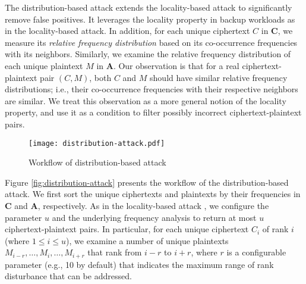 The distribution-based attack extends the locality-based attack \cite{li17} to significantly remove false positives.  It leverages the locality property in backup workloads as in the locality-based attack.  In addition, for each unique ciphertext $C$ in $\mathbf{C}$, we measure its {\em relative frequency distribution} based on its co-occurrence frequencies with its neighbors. Similarly, we examine the relative frequency distribution of each unique plaintext $M$ in $\mathbf{A}$.  Our observation is that for a real ciphertext-plaintext pair $(C, M)$, both $C$ and $M$ should have similar relative frequency distributions; i.e., their co-occurrence frequencies with their respective neighbors are similar.  We treat this observation as a more general notion of the locality property, and use it as a condition to filter possibly incorrect ciphertext-plaintext pairs. 


\begin{figure}[!htb]
    \small
    \centering
    \texttt{[image: distribution-attack.pdf]}
    \caption{Workflow of  distribution-based attack} 
    \label{fig:Workflow of  distribution-based attack}
\end{figure}


Figure \ref{fig:distribution-attack} presents the workflow of the
distribution-based attack. We first sort the unique ciphertexts and  plaintexts by
their frequencies in $\mathbf{C}$ and $\mathbf{A}$, respectively. As in the
locality-based attack \cite{li17}, we configure the parameter $u$ and 
the underlying frequency analysis to return at most $u$ ciphertext-plaintext
pairs.  In particular, for each unique ciphertext $C_i$ of rank $i$ (where 
$1 \leq i \leq u$), we examine a number of unique plaintexts $M_{i-r}, \ldots,
M_i, \ldots, M_{i+r}$ that rank from $i-r$ to $i+r$, where $r$ is a
configurable parameter (e.g., 10 by default) that indicates the maximum range
of rank disturbance that can be addressed. 

